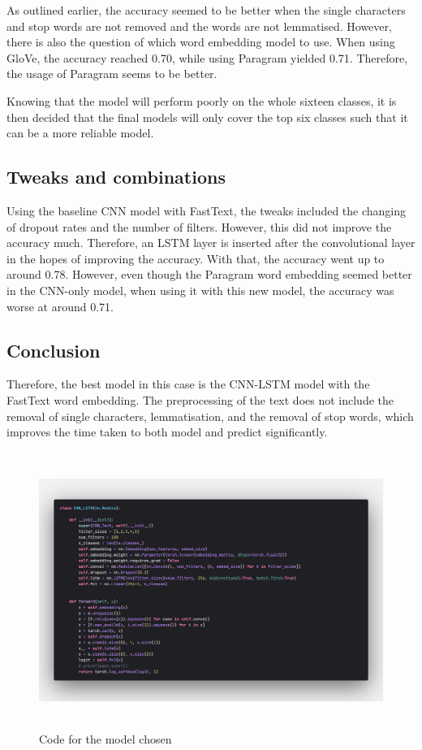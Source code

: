 \documentclass[11pt,a4paper]{article}
\begin{document}
	As outlined earlier, the accuracy seemed to be better when the single characters and stop words are not removed and the words are not lemmatised. However, there is also the question of which word embedding model to use. When using GloVe, the accuracy reached 0.70, while using Paragram yielded 0.71. Therefore, the usage of Paragram seems to be better.
	
	Knowing that the model will perform poorly on the whole sixteen classes, it is then decided that the final models will only cover the top six classes such that it can be a more reliable model.
	
	\subsection{Tweaks and combinations}
	
	Using the baseline CNN model with FastText, the tweaks included the changing of dropout rates and the number of filters. However, this did not improve the accuracy much. Therefore, an LSTM layer is inserted after the convolutional layer in the hopes of improving the accuracy. With that, the accuracy went up to around 0.78. However, even though the Paragram word embedding seemed better in the CNN-only model, when using it with this new model, the accuracy was worse at around 0.71.
	
	\subsection{Conclusion}
	
	Therefore, the best model in this case is the CNN-LSTM model with the FastText word embedding. The preprocessing of the text does not include the removal of single characters, lemmatisation, and the removal of stop words, which improves the time taken to both model and predict significantly.
	
	\begin{figure}[h!]
		\centering
		
		\includegraphics[height=9cm]{../output/visualisations/code}
		
		\caption{Code for the model chosen}
		
	\end{figure}
	
\end{document}
